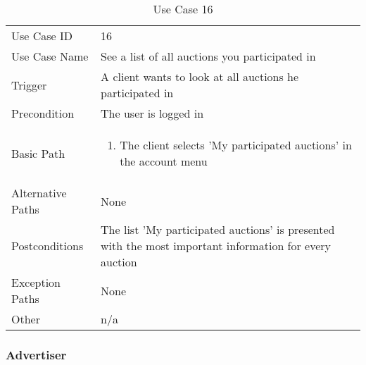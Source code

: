 \begin{table}[H]
\centering
\label{table-use-case-16}
\begin{tabular}{|p{3cm}|p{10cm}}
Use Case ID       & 16                                                           
\\
Use Case Name     & See a list of all auctions you participated in                                                         
\\
Trigger           & A client wants to look at all auctions he participated in                                          
\\
Precondition      & The user is logged in                                                
\\
Basic Path        & \begin{enumerate}
\item The client selects 'My participated auctions' in the account menu
\end{enumerate} 
     \\
Alternative Paths & None                          \\
Postconditions    & The list 'My participated auctions' is presented with the most important information for every auction
\\
Exception Paths   & None                          \\
Other             & n/a                                                                                                                                                                                                        
\end{tabular}
\caption{Use Case 16}
\end{table}


\subsubsection{Advertiser}


